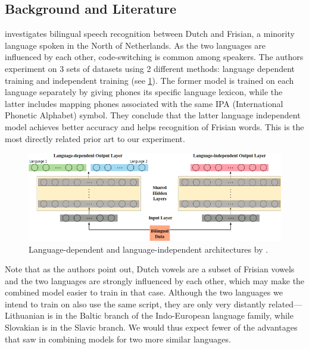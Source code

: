 \documentclass{article}
\begin{document}
  \subsection{Background and Literature} \label{literature}
  \cite{Yilmaz} investigates bilingual speech recognition between Dutch and Frisian, a minority language spoken in the North of Netherlands. As the two languages are influenced by each other, code-switching is common among speakers. The authors experiment on 3 sets of datasets using 2 different methods: language dependent training and independent training (see \ref{diagram yilmaz}). The former model is trained on each language separately by giving phones its specific language lexicon, while the latter includes mapping phones associated with the same IPA (International Phonetic Alphabet) symbol. They conclude that the latter language independent model achieves better accuracy and helps recognition of Frisian words. This is the most directly related prior art to our experiment.
  \begin{figure}[H]
    \includegraphics[width=\textwidth]{images/diagram-yilmaz}
    \caption{Language-dependent and language-independent architectures by \cite{Yilmaz}.}
    \label{diagram yilmaz}
  \end{figure}
  Note that as the authors point out, Dutch vowels are a subset of Frisian vowels and the two languages are strongly influenced by each other, which may make the combined model easier to train in that case. Although the two languages we intend to train on also use the same script, they are only very distantly related---Lithuanian is in the Baltic branch of the Indo-European language family, while Slovakian is in the Slavic branch. We would thus expect fewer of the advantages that \cite{Yilmaz} saw in combining models for two more similar languages.
\end{document}
